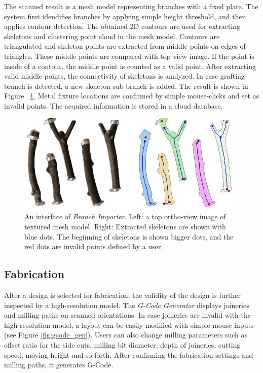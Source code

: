 The scanned result is a mesh model representing branches with a fixed plate.
The system first idendifies branches by applying simple height threshold, and then applies contour detection.
The obtained 2D contours are used for extracting skeletons and clustering point cloud in the mesh model.
Contours are triangulated and skeleton points are extracted from middle points on edges of triangles.
These middle points are compared with top view image.
If the point is inside of a contour, the middle point is counted as a valid point.
After extracting valid middle points, the connectivity of skeletons is analyzed.
In case grafting branch is detected, a new skeleton sub-branch is added.
The result is shown in Figure ~\ref{fig:skeleton}.
Metal fixture locations are confirmed by simple mouse-clicks and set as invalid points.
The acquired information is stored in a cloud database.

\begin{figure}[ht]
  \includegraphics[width = 0.4\paperwidth]{images/importer/importer.png}
  \caption{An interface of \textit{Branch Importer}. Left: a top ortho-view image of textured mesh model. Right: Extracted skeletons are shown with blue dots. The beginning of skeletons is shown bigger dots, and the red dots are invalid points defined by a user. }
  \label{fig:skeleton}
\end{figure}


\subsection{Fabrication}
\label{sec:fabrication}
After a design is selected for fabrication, the validity of the design is further inspected by a high-resolution model.
The \textit{G-Code Generator} displays joineries and milling paths on scanned orientations.
In case joineries are invalid with the high-resolution model, a layout can be easily modified with simple mouse inputs (see Figure \ref{fig:gcode_gen}).
Users can also change milling parameters such as offset ratio for the side cuts, milling bit diameter, depth of joineries, cutting speed, moving height and so forth.
After confirming the fabrication settings and milling paths, it generates G-Code.\\

